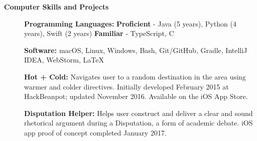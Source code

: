 \documentclass[letterpaper,10.6pt]{article}
\newcommand{\resheading}[1]{{\large \colorbox{mygrey}{\begin{minipage}{\textwidth}{\textbf{#1 \vphantom{p\^{E}}}}\end{minipage}}}}
\begin{document}
\resheading{Computer Skills and Projects}
{\small
\begin{description}
	\item[] \hspace{0.03in} \textbf{Programming Languages:} {\footnotesize \textbf{Proficient} - Java (5 years), Python (4 years), Swift (2 years) \enspace \textbf{Familiar} - TypeScript, C}
	\item[] \hspace{0.03in} \textbf{Software:} {\footnotesize macOS, Linux, Windows, Bash, Git/GitHub, Gradle, IntelliJ IDEA, WebStorm, \LaTeX}
	\item[] \hspace{0.03in} \textbf{Hot + Cold:} {\footnotesize Navigates user to a random destination in the area using warmer and colder directives. Initially developed February 2015 at HackBeanpot; updated November 2016. Available on the iOS App Store.}
	\item[] \hspace{0.03in} \textbf{Disputation Helper:} {\footnotesize Helps user construct and deliver a clear and sound rhetorical argument during a Disputation, a form of academic debate. iOS app proof of concept completed January 2017.}
	
\end{description}}
\end{document}
